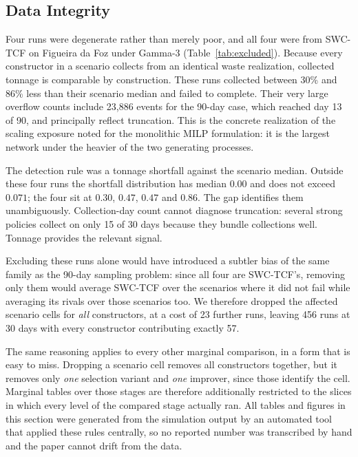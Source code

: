 \documentclass[orivec,runningheads]{llncs}
\begin{document}


\subsection{Data Integrity}
\label{sec:integrity}

Four runs were degenerate rather than merely poor, and all four were from SWC-TCF on
Figueira da Foz under Gamma-3 (Table~\ref{tab:excluded}). Because every
constructor in a scenario collects from an identical waste realization,
collected tonnage is comparable by construction. These runs collected between
30\% and 86\% less than their scenario median and failed to complete. Their very
large overflow counts include 23{,}886 events for the 90-day case, which reached
day 13 of 90, and principally reflect truncation. This is the concrete realization of the
scaling exposure noted for the monolithic MILP formulation: it is the largest
network under the heavier of the two generating processes.

The detection rule was a tonnage shortfall against the scenario median. Outside these four runs the shortfall distribution has
median $0.00$ and does not exceed $0.071$; the four sit at $0.30$, $0.47$,
$0.47$ and $0.86$. The gap identifies them unambiguously. Collection-day count
cannot diagnose truncation: several strong policies collect on only 15 of 30
days because they bundle collections well. Tonnage provides the relevant signal.

Excluding these runs alone would have introduced a subtler bias of the same
family as the 90-day sampling problem: since all four are SWC-TCF's, removing
only them would average SWC-TCF over the scenarios where it did not fail while
averaging its rivals over those scenarios too. We therefore dropped the affected
scenario cells for \emph{all} constructors, at a cost of 23 further runs,
leaving 456 runs at 30 days with every constructor contributing exactly 57.





The same reasoning applies to every other marginal comparison, in a form that is
easy to miss. Dropping a scenario cell removes all constructors together, but it
removes only \emph{one} selection variant and \emph{one} improver, since those
identify the cell. Marginal tables over those stages are therefore additionally
restricted to the slices in which every level of the compared stage actually
ran. All tables and figures in this section were generated from the simulation output by an automated tool that applied these rules centrally, so no reported
number was transcribed by hand and the paper cannot drift from the data.
\end{document}
